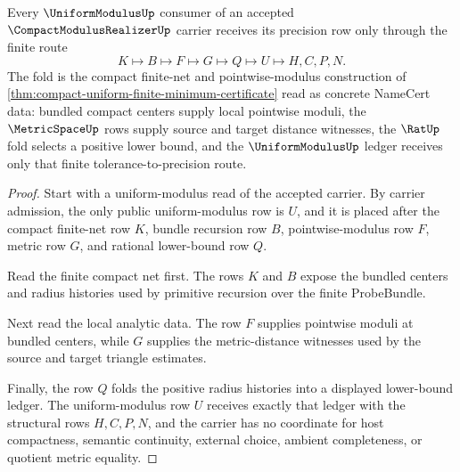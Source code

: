 \begin{theorem}
\label{thm:compact-modulus-realizer-probebundle-fold}
Every $\UniformModulusUp$ consumer of an accepted $\CompactModulusRealizerUp$ carrier receives its precision row only through the finite route
$$
K \longmapsto B \longmapsto F \longmapsto G \longmapsto Q \longmapsto U \longmapsto H,C,P,N .
$$
The fold is the compact finite-net and pointwise-modulus construction of \autoref{thm:compact-uniform-finite-minimum-certificate} read as concrete NameCert data: bundled compact centers supply local pointwise moduli, the $\MetricSpaceUp$ rows supply source and target distance witnesses, the $\RatUp$ fold selects a positive lower bound, and the $\UniformModulusUp$ ledger receives only that finite tolerance-to-precision route.
\end{theorem}
\begin{proof}
Start with a uniform-modulus read of the accepted carrier. By carrier admission, the only public uniform-modulus row is $U$, and it is placed after the compact finite-net row $K$, bundle recursion row $B$, pointwise-modulus row $F$, metric row $G$, and rational lower-bound row $Q$.

Read the finite compact net first. The rows $K$ and $B$ expose the bundled centers and radius histories used by primitive recursion over the finite ProbeBundle.

Next read the local analytic data. The row $F$ supplies pointwise moduli at bundled centers, while $G$ supplies the metric-distance witnesses used by the source and target triangle estimates.

Finally, the row $Q$ folds the positive radius histories into a displayed lower-bound ledger. The uniform-modulus row $U$ receives exactly that ledger with the structural rows $H,C,P,N$, and the carrier has no coordinate for host compactness, semantic continuity, external choice, ambient completeness, or quotient metric equality.
\end{proof}



